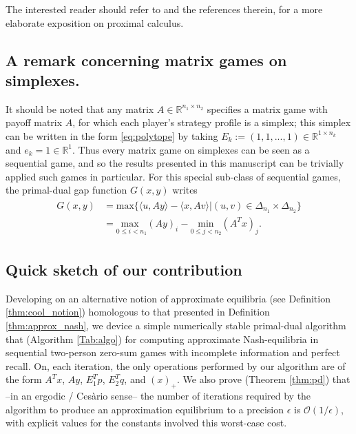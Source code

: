 \documentclass[a4paper,9pt]{extarticle}
\DeclareMathOperator{\proj}{proj}
\begin{document}
The interested reader should refer to \cite{combettes2011proximal} and
the references therein, for a more elaborate exposition on
proximal calculus. %

\subsection{A remark concerning matrix games on simplexes.} It should
be noted
that any matrix $A \in \mathbb{R}^{n_1 \times n_2}$ specifies a matrix
  game with payoff matrix $A$, for which each player's strategy
profile is a simplex; this simplex can be written in the form
\eqref{eq:polytope} by taking $E_k := (1, 1, ..., 1) \in
\mathbb{R}^{1 \times n_k}$ and $e_k = 1 \in \mathbb{R}^1$. Thus every
matrix game on simplexes can be seen as a sequential game, and so the
results presented in this manuscript can be trivially applied such
games in particular. For this special sub-class of sequential games,
the primal-dual gap function $G(x,y)$ writes
\begin{eqnarray}
\begin{split}
G(x, y) &=
\mathrm{max}\{\langle u, Ay\rangle - \langle x, Av\rangle | (u,v) \in
\Delta_{n_1} \times \Delta_{n_2}\}\\
&= \underset{0 \le i <
  n_1}{\text{max }}(Ay)_i - \underset{0 \le j < n_2}{\text{min
}}(A^Tx)_j.
\end{split}
\label{eq:mg_pd}
\end{eqnarray}

\subsection{Quick sketch of our contribution}

Developing on an alternative notion of approximate equilibria (see
Definition \ref{thm:cool_notion})
homologous to that presented in Definition \ref{thm:approx_nash}, we
device a simple numerically stable primal-dual algorithm that
(Algorithm \ref{Tab:algo}) for computing approximate Nash-equilibria
in sequential two-person zero-sum games with incomplete information and
perfect recall. On, each iteration, the only operations performed by
our algorithm are of the form $A^Tx$, $Ay$, $E_1^Tp$, $E_2^Tq$, and
$(x)_+$. We also prove (Theorem \ref{thm:pd}) that --in an ergodic /
Ces\`ario sense-- the number of iterations required by the algorithm
to produce an approximation equilibrium to a precision $\epsilon$ is
$\mathcal{O}(1/\epsilon)$, with explicit values for the constants
involved this worst-case cost.
\end{document}
